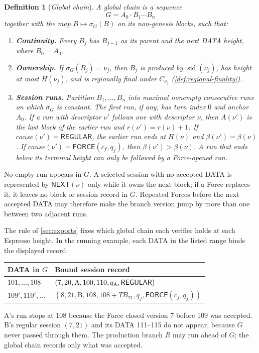 \documentclass[11pt,a4paper]{article}
\newcommand{\TB}{\mathit{TB}}
\newcommand{\tagg}[1]{\ensuremath{\mathsf{#1}}}
\newcommand{\defterm}[1]{\textcolor{rrBlue}{\textit{#1}}}
\newtheorem{definition}{Definition}[section]
\begin{document}
\begin{definition}[\defterm{Global chain}]
\label{def:global-chain}
A global chain is a sequence
\[
 G=A_0\cdot B_1\cdots B_n
\]
together with the map $B\mapsto\sigma_G(B)$ on its non-genesis blocks,
such that:
\begin{enumerate}[label=(\roman*),itemsep=2pt]
\item \textbf{Continuity.} Every $B_j$ has $B_{j-1}$ as its parent and
the next DATA height, where $B_0=A_0$.
\item \textbf{Ownership.} If $\sigma_G(B_j)=\nu_j$, then $B_j$ is
produced by $\operatorname{sid}(\nu_j)$, has height at most $H(\nu_j)$,
and is regionally final under $C_{\nu_j}$
(\cref{def:regional-finality}).
\item \textbf{Session runs.} Partition $B_1,\ldots,B_n$ into maximal
nonempty consecutive runs on which $\sigma_G$ is constant.  The first
run, if any, has turn index $0$ and anchor $A_0$.  If a run with
descriptor $\nu'$ follows one with descriptor $\nu$, then
$A(\nu')$ is the last block of the earlier run and
$r(\nu')=r(\nu)+1$.  If
$\mathit{cause}(\nu')=\tagg{REGULAR}$, the earlier run ends at
$H(\nu)$ and $\beta(\nu')=\beta(\nu)$.  If
$\mathit{cause}(\nu')=\tagg{FORCE}(c_f,q_f)$, then
$\beta(\nu')>\beta(\nu)$.  A run that ends below its terminal height can
only be followed by a Force-opened run.
\end{enumerate}
\end{definition}
No empty run appears in $G$.  A selected session with no accepted DATA
is represented by $\tagg{NEXT}(\nu)$ only while it owns the next block;
if a Force replaces it, it leaves no block or session record in $G$.
Repeated Forces before the next accepted DATA may therefore make the
branch version jump by more than one between two adjacent runs.

The rule of \cref{sec:exports} fixes which global chain each verifier
holds at each Espresso height. In the running example, each DATA in the
listed range binds the displayed record:
\begin{center}\small
\begin{tabular}{@{}ll@{}}\toprule
DATA in $G$ & Bound session record\\\midrule
$101,\ldots,108$ & $(7,20,\text{A},100,110,q_{\rm A},\tagg{REGULAR})$\\
$109',110',\ldots$ & $(8,21,\text{B},108,108+\TB_{21},q_f,\tagg{FORCE}(c_f,q_f))$\\\bottomrule
\end{tabular}
\end{center}
A's run stops at 108 because the Force closed version 7 before 109
was accepted. B's regular session $(7,21)$ and its DATA 111--115 do not
appear, because $G$ never passed through them. The production branch
$R$ may run ahead of $G$; the global chain records only what was
accepted.
\end{document}
